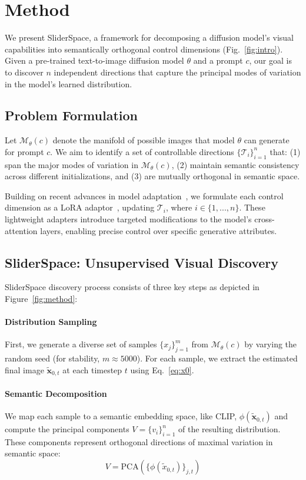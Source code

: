 \section{Method}
\label{sec:method}
We present SliderSpace, a framework for decomposing a diffusion model's visual capabilities into semantically orthogonal control dimensions (Fig.~\ref{fig:intro}). Given a pre-trained text-to-image diffusion model $\theta$ and a prompt $c$, our goal is to discover $n$ independent directions that capture the principal modes of variation in the model's learned distribution.

\subsection{Problem Formulation}

Let $\mathcal{M}_\theta(c)$ denote the manifold of possible images that model $\theta$ can generate for prompt $c$. We aim to identify a set of controllable directions $\{\mathcal{T}_i\}_{i=1}^n$ that:
(1) span the major modes of variation in $\mathcal{M}_\theta(c)$,
(2) maintain semantic consistency across different initializations, and
(3) are mutually orthogonal in semantic space.

Building on recent advances in model adaptation~\cite{gandikota2023concept}, we formulate each control dimension as a LoRA adaptor~\cite{hu2021lora}, updating $\mathcal{T}_i$, where $i \in \{1, ..., n\}$. These lightweight adapters introduce targeted modifications to the model's cross-attention layers, enabling precise control over specific generative attributes. 
\subsection{SliderSpace: Unsupervised Visual Discovery}
SliderSpace discovery process consists of three key steps as depicted in Figure~\ref{fig:method}:

\paragraph{Distribution Sampling} 
First, we generate a diverse set of samples $\{x_j\}_{j=1}^m$ from $\mathcal{M}_\theta(c)$ by varying the random seed (for stability, $m\approx5000$). For each sample, we extract the estimated final image $\tilde{\mathbf{x}}_{0,t}$ at each timestep $t$ using Eq.~\ref{eq:x0}.

\paragraph{Semantic Decomposition}
We map each sample to a semantic embedding space, like CLIP, $\phi(\tilde{\mathbf{x}}_{0,t})$ and compute the principal components $V=\{v_i\}_{i=1}^n$ of the resulting distribution. These components represent orthogonal directions of maximal variation in semantic space:
\begin{equation}
    V = \text{PCA}(\{\phi(\tilde{x}_{0,t})\}_{j,t})
\end{equation}

